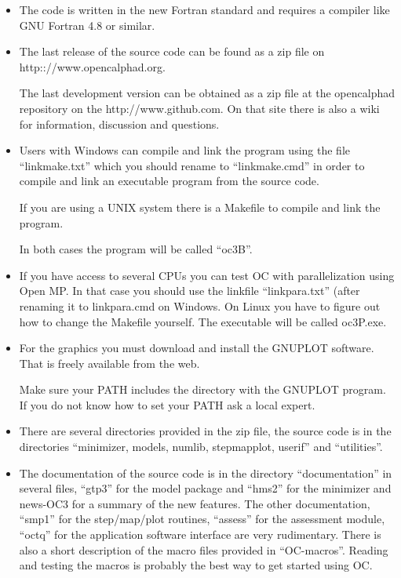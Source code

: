 \documentclass[12pt]{article}
\begin{document}
\begin{itemize}
\item The code is written in the new Fortran standard and requires a
  compiler like GNU Fortran 4.8 or similar.

\item The last release of the source code can be found as a zip file
  on http:://www.opencalphad.org.

  The last development version can be obtained as a zip file at the
  opencalphad repository on the http://www.github.com.  On that site
  there is also a wiki for information, discussion and questions.

\item Users with Windows can compile and link the program using the
  file ``linkmake.txt'' which you should rename to ``linkmake.cmd'' in
  order to compile and link an executable program from the source
  code.

  If you are using a UNIX system there is a Makefile to compile and link
  the program.

  In both cases the program will be called ``oc3B''.

\item If you have access to several CPUs you can test OC with
  parallelization using Open MP.  In that case you should use the
  linkfile ``linkpara.txt'' (after renaming it to linkpara.cmd on
  Windows.  On Linux you have to figure out how to change the Makefile
  yourself.  The executable will be called oc3P.exe.

\item For the graphics you must download and install the GNUPLOT
  software.  That is freely available from the web.

  Make sure your PATH includes the directory with the GNUPLOT program.
  If you do not know how to set your PATH ask a local expert.

\item There are several directories provided in the zip file, the
  source code is in the directories ``minimizer, models, numlib,
  stepmapplot, userif'' and ``utilities''.

\item The documentation of the source code is in the directory
  ``documentation'' in several files, ``gtp3'' for the model package
  and ``hms2'' for the minimizer and news-OC3 for a summary of the new
  features.  The other documentation, ``smp1'' for the step/map/plot
  routines, ``assess'' for the assessment module, ``octq'' for the
  application software interface are very rudimentary.  There is also
  a short description of the macro files provided in ``OC-macros''.
  Reading and testing the macros is probably the best way to get
  started using OC.


\end{itemize}
\end{document}
